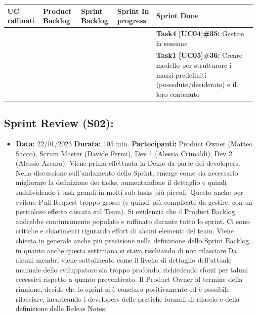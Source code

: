 \documentclass[a4paper, oneside]{article}
\newcommand\due{Scrum Master (Davide Fermi), Dev 1 (Alessia Crimaldi), Dev 2 (Alessio Arcara).}
\newcommand\dueP{Product Owner (Matteo Sacco), }
\begin{document}
\begin{landscape}
        \newpage
        \noindent
        \begin{tabular}{ | p{5cm} | p{3cm} | p{5cm} | p{5cm} | p{5cm}| }
            \hline
            \textbf{UC raffinati}
            & \textbf{Product Backlog}
            & \textbf{Sprint Backlog}
            & \textbf{Sprint In progress}
            & \textbf{Sprint Done} \\
            \hline
            \hline
            & &   & & \textbf{Task4 [UC04]\#35:} Gestire la sessione\\
            \hline
            & &   & & \textbf{Task1 [UC05]\#36:} Creare modello per strutturare i mazzi predefiniti (possedute/desiderate) e il loro contenuto\\
            \hline
        \end{tabular}

        \newpage
        \normalsize
        \subsection{Sprint Review (S02):}
        \begin{itemize}
            \item \textbf{Data:} 22/01/2023
            \newline \textbf{Durata:} 105 min.
            \newline \textbf{Partecipanti:}  \dueP \due
            \newline
            \newline Viene prima effettuata la Demo da parte dei devolopers. Nella discussione sull'andamento dello Sprint, emerge come sia necessario migliorare la definizione dei tasks, aumentandone il dettaglio e quindi suddividendo i task grandi in molti sub-tasks più piccoli. Questo anche per evitare Pull Request troppo grosse (e quindi più complicate da gestire, con un pericoloso effetto cascata sul Team). Si evidenzia che il Product Backlog andrebbe continuamente popolato e raffinato durante tutto lo sprint. Ci sono critiche e chiarimenti rigurardo effort di alcuni elementi del team. Viene chiesta in generale anche più precisione nella definizione dello Sprint Backlog, in quanto anche questa settimana si stava rischiando di non rilasciare.Da alcuni membri viene sottolineato come il livello di dettaglio dell'attuale manuale dello sviluppatore sia troppo profondo, richiedendo sforzi per taluni eccessivi rispetto a quanto preventivato. Il Product Owner al termine della riunione, decide che lo sprint si è concluso positivamente ed è possibile rilasciare, incaricando i developers delle pratiche formali di rilascio e della definizione delle Releas Notes.


\end{itemize}
\end{landscape}
\end{document}
